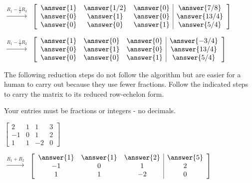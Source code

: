 \documentclass{ximera}
\begin{document}
\begin{problem}
\begin{problem}
\begin{center}
 
 $\begin{array}{c}
 \xrightarrow{R_1-\frac{1}{2}R_3}\\
\\
\\
\end{array}$
$\left[\begin{array}{ccc|c}  
 \answer{1}&\answer{1/2}&\answer{0}&\answer{7/8}\\\answer{0}&\answer{1}&\answer{0}&\answer{13/4}\\\answer{0}&\answer{0}&\answer{1}&\answer{5/4}
 \end{array}\right]$
 
$ \begin{array}{c}
 \xrightarrow{R_1-\frac{1}{2}R_2}\\
\\
\\
\end{array}$
$\left[\begin{array}{ccc|c}  
 \answer{1}&\answer{0}&\answer{0}&\answer{-3/4}\\\answer{0}&\answer{1}&\answer{0}&\answer{13/4}\\\answer{0}&\answer{0}&\answer{1}&\answer{5/4}
 \end{array}\right]$
\end{center}
 \end{problem}
 
 \begin{problem}\label{prob:twowaystorref2}
The following reduction steps do not follow the algorithm but are easier for a human to carry out because they use fewer fractions. Follow the indicated steps to carry the matrix to its reduced row-echelon form.

Your entries must be fractions or integers - no decimals.

\begin{center}
$\left[\begin{array}{ccc|c}  2&1&1&3\\-1&0&1&2\\1&1&-2&0
 \end{array}\right]$
 
$\begin{array}{c}
  \xrightarrow{R_1+R_2}\\
\\
\\
 \end{array}$
$\left[\begin{array}{ccc|c}  
 \answer{1}&\answer{1}&\answer{2}&\answer{5}\\-1&0&1&2\\1&1&-2&0
 \end{array}\right]$
 

\end{center}
\end{problem}
\end{problem}
\end{document}
